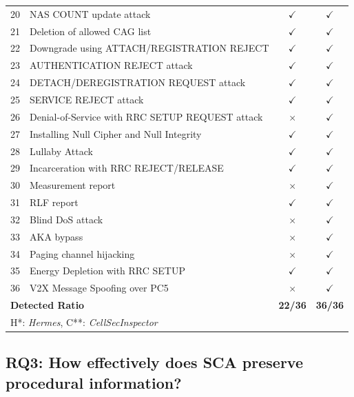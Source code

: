 \documentclass[sigconf]{acmart}
\newcommand{\cmark}{$\checkmark$}
\newcommand{\xmark}{$\times$}
\newcommand{\lm}{\textit{CellSecInspector}\xspace}
\begin{document}
{\begin{table}[ht]
\begin{tabularx}{\linewidth}{p{.1cm} p{5.7cm} c c}
20 & NAS COUNT update attack \cite{al2024hermes} & \cmark & \cmark \\
21 & Deletion of allowed CAG list \cite{al2024hermes} & \cmark & \cmark \\
22 & Downgrade using ATTACH/REGISTRATION REJECT \cite{shaik2015practical} & \cmark & \cmark \\
23 & AUTHENTICATION REJECT attack \cite{8958725} & \cmark & \cmark \\
24 & DETACH/DEREGISTRATION REQUEST attack \cite{hussain2018lteinspector} & \cmark & \cmark \\
25 & SERVICE REJECT attack \cite{shaik2015practical} & \cmark & \cmark \\
26 & Denial-of-Service with RRC SETUP REQUEST attack \cite{hussain20195greasoner} & \xmark & \cmark \\
27 & Installing Null Cipher and Null Integrity \cite{hussain20195greasoner} & \cmark & \cmark \\
28 & Lullaby Attack \cite{hussain20195greasoner} & \cmark & \cmark \\
29 & Incarceration with RRC REJECT/RELEASE \cite{hussain20195greasoner} & \cmark & \cmark \\
30 & Measurement report \cite{shaik2015practical} & \xmark & \cmark \\
31 & RLF report \cite{shaik2015practical} & \cmark & \cmark \\
32 & Blind DoS attack \cite{kim2019touching} & \xmark & \cmark \\
33 & AKA bypass \cite{kim2019touching} & \xmark & \cmark \\
34 & Paging channel hijacking \cite{hussain2018lteinspector} & \xmark & \cmark \\
35 & Energy Depletion with RRC SETUP \cite{al2024hermes} & \cmark & \cmark \\
36 & V2X Message Spoofing over PC5 \cite{sedar2023comprehensive} & \xmark & \cmark \\
\midrule
\multicolumn{2}{l}{\textbf{Detected Ratio}} & \textbf{22/36} & \textbf{36/36} \\
\multicolumn{4}{l}{H*: \textit{Hermes}, C**: \lm} \\
\bottomrule
\end{tabularx}
\vspace{-0.2in}
\end{table}


\subsection{RQ3: How effectively does SCA preserve procedural information?}


}
\end{document}
